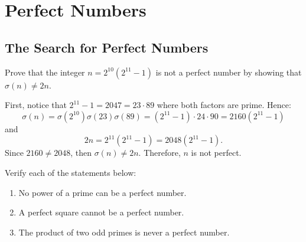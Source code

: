 \chapter{Perfect Numbers}

\section{The Search for Perfect Numbers}

\begin{exercise}
    Prove that the integer $n = 2^{10}(2^{11} - 1)$ is not a perfect number by showing that $\sigma(n) \neq 2n$.  \\
\end{exercise}

\begin{solution}
    First, notice that $2^{11} - 1 = 2047 = 23\cdot 89$ where both factors are prime. Hence:
    $$\sigma(n) = \sigma(2^{10})\sigma(23)\sigma(89) = (2^{11} - 1)\cdot 24\cdot 90 = 2160(2^{11} - 1)$$
    and
    $$2n = 2^{11}(2^{11} - 1) = 2048(2^{11} - 1).$$
    Since $2160 \neq 2048$, then $\sigma(n) \neq 2n$. Therefore, $n$ is not perfect. \\
\end{solution}

\begin{exercise}
    Verify each of the statements below:
    \begin{enumerate}
        \item No power of a prime can be a perfect number.
        \item A perfect square cannot be a perfect number.
        \item The product of two odd primes is never a perfect number. \\
    \end{enumerate}
\end{exercise}

